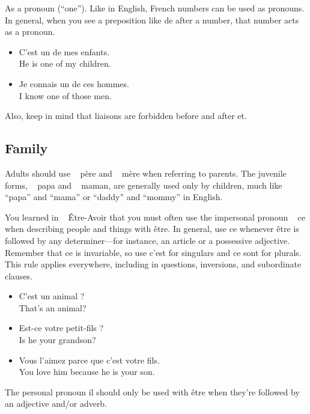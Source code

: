 As a pronoun (``one''). Like in English, French numbers can be used as pronouns. In general, when you see a preposition like de after a number, that number acts as a pronoun.

\begin{itemize}
  \item  C'est un de mes enfants. \\ He is one of my children.
  \item  Je connais un de ces hommes. \\ I know one of those men.
\end{itemize}

Also, keep in mind that liaisons are forbidden before and after et.


\pagebreak
\subsection{Family}

Adults should use \guillemotleft~ p{\`e}re \guillemotright and \guillemotleft~ m{\`e}re \guillemotright when referring to parents. The juvenile forms, \guillemotleft~ papa \guillemotright and \guillemotleft~ maman\guillemotright , are generally used only by children, much like ``papa'' and ``mama'' or ``daddy'' and ``mommy'' in English.

You learned in \guillemotleft~ {\^E}tre-Avoir \guillemotright that you must often use the impersonal pronoun \guillemotleft~ ce \guillemotright when describing people and things with {\^e}tre. In general, use ce whenever {\^e}tre is followed by any determiner---for instance, an article or a possessive adjective. Remember that ce is invariable, so use c'est for singulars and ce sont for plurals.  This rule applies everywhere, including in questions, inversions, and subordinate clauses.

\begin{itemize}
  \item  C'est un animal ? \\ That's an animal?
  \item  Est-ce votre petit-fils ? \\ Is he your grandson?
  \item  Vous l'aimez parce que c'est votre fils. \\ You love him because he is your son.
\end{itemize}

The personal pronoun il should only be used with {\^e}tre when they're followed by an adjective and/or adverb.


